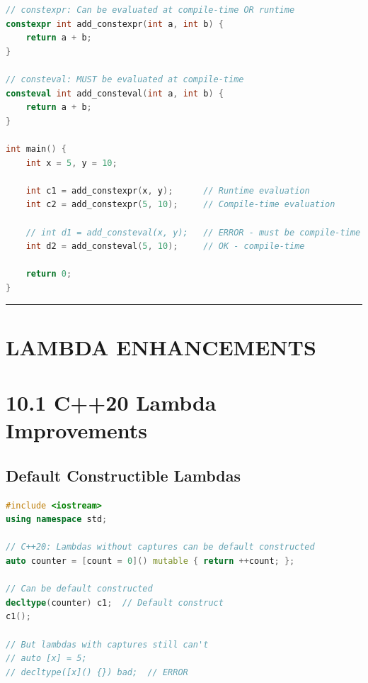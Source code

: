 \begin{lstlisting}[language={C++}]
// constexpr: Can be evaluated at compile-time OR runtime
constexpr int add_constexpr(int a, int b) {
    return a + b;
}

// consteval: MUST be evaluated at compile-time
consteval int add_consteval(int a, int b) {
    return a + b;
}

int main() {
    int x = 5, y = 10;
    
    int c1 = add_constexpr(x, y);      // Runtime evaluation
    int c2 = add_constexpr(5, 10);     // Compile-time evaluation
    
    // int d1 = add_consteval(x, y);   // ERROR - must be compile-time
    int d2 = add_consteval(5, 10);     // OK - compile-time
    
    return 0;
}
\end{lstlisting}

\begin{center}\rule{0.5\linewidth}{0.5pt}\end{center}

\hypertarget{lambda-enhancements}{%
\section{LAMBDA ENHANCEMENTS}\label{lambda-enhancements}}

\hypertarget{c20-lambda-improvements}{%
\section{10.1 C++20 Lambda Improvements}\label{c20-lambda-improvements}}

\hypertarget{default-constructible-lambdas}{%
\subsection{Default Constructible
Lambdas}\label{default-constructible-lambdas}}

\begin{lstlisting}[language={C++}]
#include <iostream>
using namespace std;

// C++20: Lambdas without captures can be default constructed
auto counter = [count = 0]() mutable { return ++count; };

// Can be default constructed
decltype(counter) c1;  // Default construct
c1();

// But lambdas with captures still can't
// auto [x] = 5;
// decltype([x]() {}) bad;  // ERROR
\end{lstlisting}

